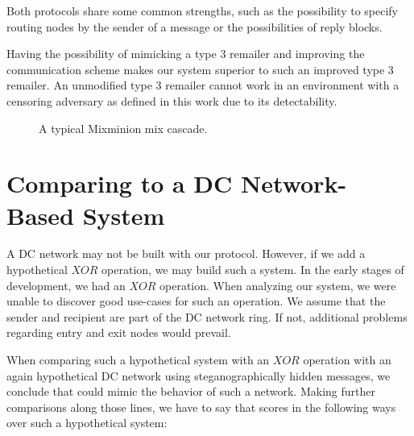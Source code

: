 Both protocols share some common strengths, such as the possibility to specify routing nodes by the sender of a message or the possibilities of reply blocks. 

Having the possibility of mimicking a type 3 remailer and improving the communication scheme makes our system superior to such an improved type 3 remailer. An unmodified type 3 remailer cannot work in an environment with a censoring adversary as defined in this work due to its detectability. 

\begin{figure}[ht]\centering
	
	\caption{A typical Mixminion mix cascade.}
	\label{fig:mmCommPattern}
\end{figure}

\section{Comparing \MessageVortex{} to a DC Network-Based System}
A DC network may not be built with our \MessageVortex{} protocol. However, if we add a hypothetical $XOR$ operation, we may build such a system. In the early stages of development, we had an $XOR$ operation. When analyzing our system, we were unable to discover good use-cases for such an operation. We assume that the sender and recipient are part of the DC network ring. If not, additional problems regarding entry and exit nodes would prevail. 

When comparing such a hypothetical \MessageVortex{} system with an $XOR$ operation with an again hypothetical DC network using steganographically hidden messages, we conclude that \MessageVortex{} could mimic the behavior of such a network. Making further comparisons along those lines, we have to say that \MessageVortex{} scores in the following ways over such a hypothetical system:


